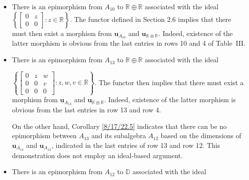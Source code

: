 \documentclass{amsart}
\numberwithin{equation}{section}
\theoremstyle{definition}
\numberwithin{theorem}{section}
\begin{document}
\begin{itemize}
 \item There is an epimorphism from $A_{10}$ to $\mathbb{R}\oplus\mathbb{R}$ associated with the ideal $\left\{\left[\begin{array}{ccc}
 0 & z   \\ 
 0 & 0    
\end{array}\right]:z\in \mathbb{R}\right\}$.  The functor defined in Section 2.6 implies that there must then exist a morphism from $\mathbf{u}_{A_{10}}$ and $\mathbf{u}_{\mathbb{R}\oplus\mathbb{R}}$.  Indeed, existence of the latter morphism is obvious from the last entries in rows 10 and 4 of \mbox{Table III}.
 \item There is an epimorphism from $A_{13}$ to $\mathbb{R}\oplus\mathbb{R}$ associated with the ideal

 $\left\{\left[\begin{array}{ccc}
0  & z & w   \\
 0 & 0 & v \\
 0 & 0 & 0    
\end{array}\right]:z,w,v\in\mathbb{R}\right\}$. The functor then implies that there must exist a morphism from $\mathbf{u}_{A_{13}}$ and $\mathbf{u}_{\mathbb{R}\oplus\mathbb{R}}$.  Indeed, existence of the latter morphism is obvious from the last entries in row 13 and row 4.  

On the other hand, Corollary \ref{8/17/22.5} indicates that there can be no epimorphism between $A_{13}$ and its subalgebra $A_{12}$ based on the dimensions of $\mathbf{u}_{A_{13}}$ and $\mathbf{u}_{A_{12}}$, indicated in the last entries of row 13 and row 12.  This demonstration does not employ an ideal-based argument.
 \item 
There is an epimorphism from $A_{12}$ to  $\mathbb{D}$ associated with the ideal


\end{itemize}
\end{document}

